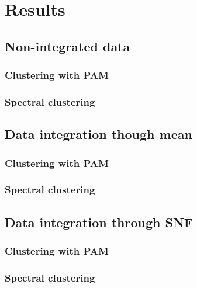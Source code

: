 \chapter{Results}
\section{Non-integrated data}
\subsection{Clustering with PAM}
\subsection{Spectral clustering}
\section{Data integration though mean}
\subsection{Clustering with PAM}
\subsection{Spectral clustering}
\section{Data integration through SNF}
\subsection{Clustering with PAM}
\subsection{Spectral clustering}